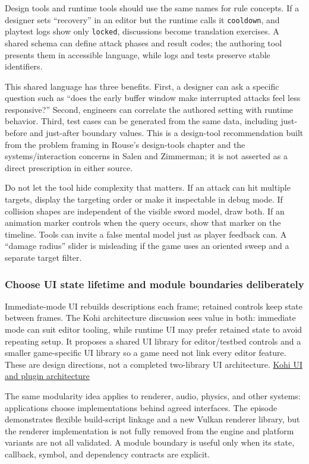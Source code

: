 Design tools and runtime tools should use the same names for rule concepts. If a designer sets ``recovery'' in an editor but the runtime calls it \texttt{cooldown}, and playtest logs show only \texttt{locked}, discussions become translation exercises. A shared schema can define attack phases and result codes; the authoring tool presents them in accessible language, while logs and tests preserve stable identifiers.

This shared language has three benefits. First, a designer can ask a specific question such as ``does the early buffer window make interrupted attacks feel less responsive?'' Second, engineers can correlate the authored setting with runtime behavior. Third, test cases can be generated from the same data, including just-before and just-after boundary values. This is a design-tool recommendation built from the problem framing in Rouse's design-tools chapter and the systems/interaction concerns in Salen and Zimmerman; it is not asserted as a direct prescription in either source.

Do not let the tool hide complexity that matters. If an attack can hit multiple targets, display the targeting order or make it inspectable in debug mode. If collision shapes are independent of the visible sword model, draw both. If an animation marker controls when the query occurs, show that marker on the timeline. Tools can invite a false mental model just as player feedback can. A ``damage radius'' slider is misleading if the game uses an oriented sweep and a separate target filter.

\subsubsection{Choose UI state lifetime and module boundaries deliberately}\label{06-engine-ii-ch032-choose-ui-state-lifetime-and-module-boundaries-deliberately}

Immediate-mode UI rebuilds descriptions each frame; retained controls keep state between frames. The Kohi architecture discussion sees value in both: immediate mode can suit editor tooling, while runtime UI may prefer retained state to avoid repeating setup. It proposes a shared UI library for editor/testbed controls and a smaller game-specific UI library so a game need not link every editor feature. These are design directions, not a completed two-library UI architecture. \href{https://www.youtube.com/watch?v=6cn8Ip0IJsw}{Kohi UI and plugin architecture}

The same modularity idea applies to renderer, audio, physics, and other systems: applications choose implementations behind agreed interfaces. The episode demonstrates flexible build-script linkage and a new Vulkan renderer library, but the renderer implementation is not fully removed from the engine and platform variants are not all validated. A module boundary is useful only when its state, callback, symbol, and dependency contracts are explicit.


